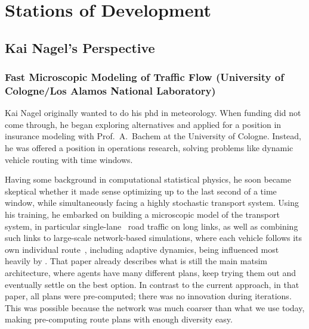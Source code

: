 \section{Stations of Development}
\subsection{Kai Nagel's Perspective}

\subsubsection{Fast Microscopic Modeling of Traffic Flow (University of Cologne/Los Alamos National Laboratory)}
\label{sec:history-u-of-cologne-phase}

Kai Nagel originally wanted to do his \acrshort{phd} 
in meteorology.  When funding did not come through, he began exploring alternatives and applied for a position in insurance modeling with Prof.\ A.\ Bachem at the University of Cologne.  Instead, he was offered a position in operations research, solving problems like dynamic vehicle routing with time windows. 

Having some background in computational statistical physics, he soon became skeptical whether it made sense optimizing up to the last second of a time window, while simultaneously  facing a highly stochastic transport system.  Using his training, he embarked on building a microscopic model of the transport system, in particular single-lane~\citep{NagelSchreckenberg1992CA,Nagel1999flowTheoTrr} road traffic on long links, as well as combining such links to large-scale network-based simulations, where each vehicle follows its own individual route~\citep{Nagel1996NRW}, including adaptive dynamics, being influenced most heavily by \cite{ArthurBar}.  That paper already \citep{Nagel1996NRW} describes what is still the main \gls{matsim} architecture, where agents have many different plans, keep trying them out and eventually settle on the best option.  In contrast to the current approach, in that paper, all plans were pre-computed; \ie there was no innovation during iterations.  This was possible because the network was much coarser than what we use today, making pre-computing route plans with enough diversity easy.

